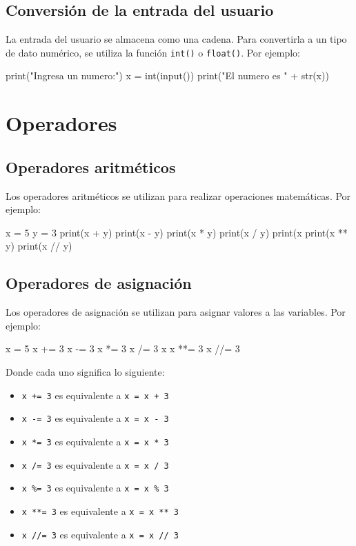 \documentclass{article}
\begin{document}
\subsection{Conversión de la entrada del usuario}
La entrada del usuario se almacena como una cadena. Para convertirla a un tipo de dato numérico, se utiliza la función \texttt{int()} o \texttt{float()}. Por ejemplo:
\begin{python_code}
print("Ingresa un numero:")
x = int(input())
print("El numero es " + str(x))
\end{python_code}

\section{Operadores}

\subsection{Operadores aritméticos}
Los operadores aritméticos se utilizan para realizar operaciones matemáticas. Por ejemplo:
\begin{python_code}
x = 5
y = 3
print(x + y)
print(x - y)
print(x * y)
print(x / y)
print(x %
print(x ** y)
print(x // y)
\end{python_code}

\subsection{Operadores de asignación}
Los operadores de asignación se utilizan para asignar valores a las variables. Por ejemplo:
\begin{python_code}
x = 5
x += 3
x -= 3
x *= 3
x /= 3
x %
x **= 3
x //= 3
\end{python_code}
Donde cada uno significa lo siguiente:
\begin{itemize}
    \item \texttt{x += 3} es equivalente a \texttt{x = x + 3}
    \item \texttt{x -= 3} es equivalente a \texttt{x = x - 3}
    \item \texttt{x *= 3} es equivalente a \texttt{x = x * 3}
    \item \texttt{x /= 3} es equivalente a \texttt{x = x / 3}
    \item \texttt{x \%= 3} es equivalente a \texttt{x = x \% 3}
    \item \texttt{x **= 3} es equivalente a \texttt{x = x ** 3}
    \item \texttt{x //= 3} es equivalente a \texttt{x = x // 3}
\end{itemize}
\end{document}

